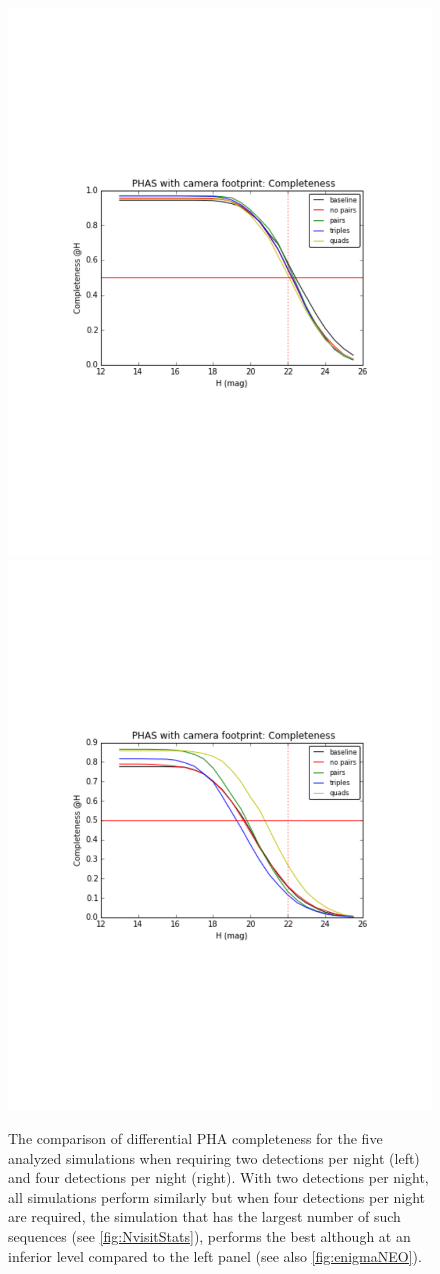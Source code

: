 \begin{figure}[th!]
\vskip -1.2in
\includegraphics[angle=0,width=0.49\hsize:,clip]{figs/diffNEOpairs.pdf}
\includegraphics[angle=0,width=0.49\hsize:,clip]{figs/diffNEOquads.pdf}
\vskip -1.3in
\caption{
The comparison of differential PHA completeness for the five analyzed simulations
when requiring two detections per night (left) and four detections per night (right).
With two detections per night, all simulations perform similarly but when four
detections per night are required, the simulation that has the largest number
of such sequences (see \autoref{fig:NvisitStats}), performs the best although at an
inferior level compared to the left panel (see also \autoref{fig:enigmaNEO}).}
\label{fig:NEOquads}
\end{figure}



